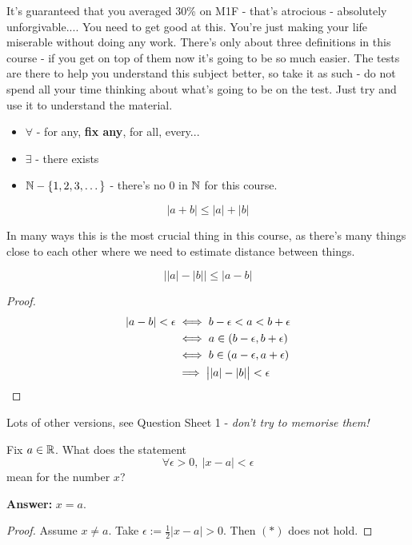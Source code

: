 \documentclass[10pt,twoside]{scrartcl}
\begin{document}
It's guaranteed that you averaged 30\% on M1F - that's atrocious - absolutely unforgivable.... You need to get good at this. You're just making your life miserable without doing any work. There's only about three definitions in this course - if you get on top of them now it's going to be so much easier. The tests are there to help you understand this subject better, so take it as such - do not spend all your time thinking about what's going to be on the test. Just try and use it to understand the material. 

\begin{itemize}
\item $\forall$ - for any, \textbf{fix any}, for all, every...
\item $\exists$ - there exists
\item $\mathbb{N} - \{1,2,3,\dots\}$ - there's no $0$ in $\mathbb{N}$ for this course.
\end{itemize}

\begin{theorem}
	\[|a+b| \leq |a| + |b|\]
\end{theorem}

In many ways this is the most crucial thing in this course, as there's many things close to each other where we need to estimate distance between things. 

\begin{corollary}
\[\left||a| - |b|\right|\leq |a-b|	\]
\end{corollary}
\begin{proof}
\begin{align*}
|a-b| < \epsilon &\iff b-\epsilon < a < b + \epsilon\\
&\iff a \in (b-\epsilon, b+\epsilon)\\
&\iff b \in (a-\epsilon, a+\epsilon)	\\
&\implies \left||a| - |b|\right|< \epsilon\qedhere
\end{align*} 
\end{proof}

Lots of other versions, see Question Sheet 1 - \emph{don't try to memorise them!}\\



\begin{clicker}
Fix $a \in\mathbb{R}$. What does the statement 
\[\forall \epsilon >0,~|x-a|<\epsilon \tag{$*$}\]
mean for the number $x$? 

\textbf{Answer:} $x = a$. 
\begin{proof}
Assume $x \neq a$. Take $\epsilon := \frac{1}{2}|x-a| > 0$. Then $(*)$ does not hold.	
\end{proof}

\end{clicker}
\end{document}
